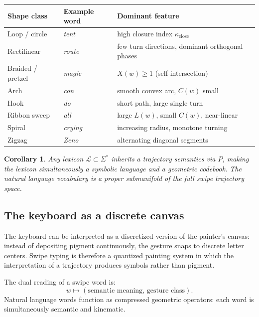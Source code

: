 \documentclass[12pt,a4paper]{article}
\theoremstyle{plain}
\newtheorem{corollary}[theorem]{Corollary}
\theoremstyle{definition}
\begin{document}
\begin{center}
\begin{tabular}{llll}
\toprule
\textbf{Shape class} & \textbf{Example word} & \textbf{Dominant feature} \\
\midrule
Loop / circle   & \textit{tent}   & high closure index $\kappa_{\mathrm{close}}$ \\
Rectilinear     & \textit{route}  & few turn directions, dominant orthogonal phases \\
Braided / pretzel & \textit{magic} & $X(w) \geq 1$ (self-intersection) \\
Arch            & \textit{con}    & smooth convex arc, $C(w)$ small \\
Hook            & \textit{do}     & short path, large single turn \\
Ribbon sweep    & \textit{all}    & large $L(w)$, small $C(w)$, near-linear \\
Spiral          & \textit{crying} & increasing radius, monotone turning \\
Zigzag          & \textit{Zeno}   & alternating diagonal segments \\
\bottomrule
\end{tabular}
\end{center}

\begin{corollary}
Any lexicon $\mathcal{L}\subset\Sigma^*$ inherits a \emph{trajectory semantics}
via $P$, making the lexicon simultaneously a symbolic language and a geometric
codebook. The natural language vocabulary is a proper submanifold of the full
swipe trajectory space.
\end{corollary}

\subsection{The keyboard as a discrete canvas}

The keyboard can be interpreted as a discretized version of the painter's canvas:
instead of depositing pigment continuously, the gesture snaps to discrete letter
centers. Swipe typing is therefore a quantized painting system in which the
interpretation of a trajectory produces symbols rather than pigment.

The dual reading of a swipe word is:
\[
w \mapsto (\text{semantic meaning},\, \text{gesture class}).
\]
Natural language words function as compressed geometric operators: each word
is simultaneously semantic and kinematic.
\end{document}
